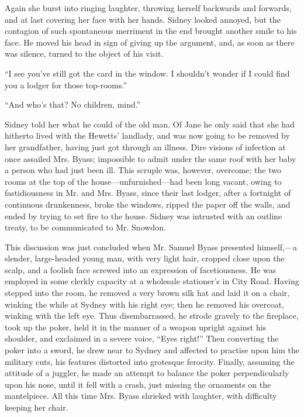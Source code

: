 Again she burst into ringing laughter, throwing herself backwards and
forwards, and {\protect\hypertarget{159}{}{}}at last covering her face
with her hands. Sidney looked annoyed, but the contagion of such
spontaneous merriment in the end brought another smile to his face. He
moved his head in sign of giving up the argument, and, as soon as there
was silence, turned to the object of his visit.

``I see you've still got the card in the window. I shouldn't wonder if I
could find you a lodger for those top-rooms.''

``And who's that? No children, mind.''

Sidney told her what he could of the old man. Of Jane he only said that
she had hitherto lived with the Hewetts' landlady, and was now going to
be removed by her grandfather, having just got through an illness. Dire
visions of infection at once assailed Mrs. Byass; impossible to admit
under the same roof with her baby a person who had just been ill. This
scruple was, however, overcome; the two rooms at the top of the
house---unfurnished---had been long vacant, owing to fastidiousness in
Mr. and Mrs. Byass, since their last lodger, after a fortnight of
{\protect\hypertarget{160}{}{}}continuous drunkenness, broke the
windows, ripped the paper off the walls, and ended by trying to set fire
to the house. Sidney was intrusted with an outline treaty, to be
communicated to Mr. Snowdon.

This discussion was just concluded when Mr. Samuel Byass presented
himself,---a slender, large-headed young man, with very light hair,
cropped close upon the scalp, and a foolish face screwed into an
expression of facetiousness. He was employed in some clerkly capacity at
a wholesale stationer's in City Road. Having stepped into the room, he
removed a very brown silk hat and laid it on a chair, winking the while
at Sydney with his right eye; then he removed his overcoat, winking with
the left eye. Thus disembarrassed, he strode gravely to the fireplace,
took up the poker, held it in the manner of a weapon upright against his
shoulder, and exclaimed in a severe voice, ``Eyes right!'' Then
converting the poker into a sword, he drew near to Sydney and affected
to practise upon him the military cuts, his features
{\protect\hypertarget{161}{}{}}distorted into grotesque ferocity.
Finally, assuming the attitude of a juggler, he made an attempt to
balance the poker perpendicularly upon his nose, until it fell with a
crash, just missing the ornaments on the mantelpiece. All this time Mrs.
Byass shrieked with laughter, with difficulty keeping her chair.

